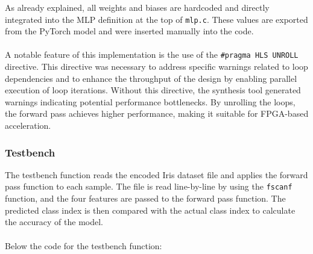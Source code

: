 \documentclass{article}
\begin{document}
As already explained, all weights and biases are hardcoded and directly integrated into the MLP definition at the top of \texttt{mlp.c}. These values are exported from the PyTorch model and were inserted manually into the code.
\\\\A notable feature of this implementation is the use of the \texttt{\#pragma HLS UNROLL} directive. This directive was necessary to address specific warnings related to loop dependencies and to enhance the throughput of the design by enabling parallel execution of loop iterations. Without this directive, the synthesis tool generated warnings indicating potential performance bottlenecks. By unrolling the loops, the forward pass achieves higher performance, making it suitable for FPGA-based acceleration.

\subsubsection{Testbench}
The testbench function reads the encoded Iris dataset file and applies the forward pass function to each sample.
The file is read line-by-line by using the \texttt{fscanf} function, and the four features are passed to the forward pass function.
The predicted class index is then compared with the actual class index to calculate the accuracy of the model.
\\\\Below the code for the testbench function:
\end{document}
